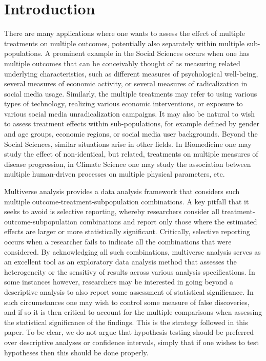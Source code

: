 \documentclass[pdflatex,sn-mathphys-num]{sn-jnl}%
\theoremstyle{thmstyleone}%
\theoremstyle{thmstyletwo}%
\theoremstyle{thmstylethree}%
\begin{document}



\maketitle

\section{Introduction}
\label{sec:intro}


There are many applications where one wants to assess the effect of multiple treatments on multiple outcomes, potentially also separately within multiple sub-populations.
A prominent example in the Social Sciences occurs when one has multiple outcomes that can be conceivably thought of as measuring related underlying characteristics, such as different measures of psychological well-being, several measures of economic activity, or several measures of radicalization in social media usage.
Similarly, the multiple treatments may refer to using various types of technology, realizing various economic interventions, or exposure to various social media unradicalization campaigns.
It may also be natural to wish to assess treatment effects within sub-populations, for example defined by gender and age groups, economic regions, or social media user backgrounds.
Beyond the Social Sciences, similar situations arise in other fields. In Biomedicine one may study the effect of non-identical, but related, treatments on multiple measures of disease progression, in Climate Science one may study the association between multiple human-driven processes on multiple physical parameters, etc.

Multiverse analysis provides a data analysis framework that considers such multiple outcome-treatment-subpopulation combinations.
A key pitfall that it seeks to avoid is selective reporting, whereby researchers consider all treatment-outcome-subpopulation combinations and report only those where the estimated effects are larger or more statistically significant. Critically, selective reporting occurs when a researcher fails to indicate all the combinations that were considered.
By acknowledging all such combinations, multiverse analysis serves as an excellent tool as an exploratory data analysis method that assesses the heterogeneity or the sensitivy of results across various analysis specifications.
In some instances however, researchers may be interested in going beyond a descriptive analysis to also report some assessment of statistical significance. In such circumstances one may wish to control some measure of false discoveries, and if so it is then critical to account for the multiple comparisons when assessing the statistical significance of the findings. This is the strategy followed in this paper. To be clear, we do not argue that hypothesis testing should be preferred over descriptive analyses or confidence intervals, simply that if one wishes to test hypotheses then this should be done properly.
\end{document}
